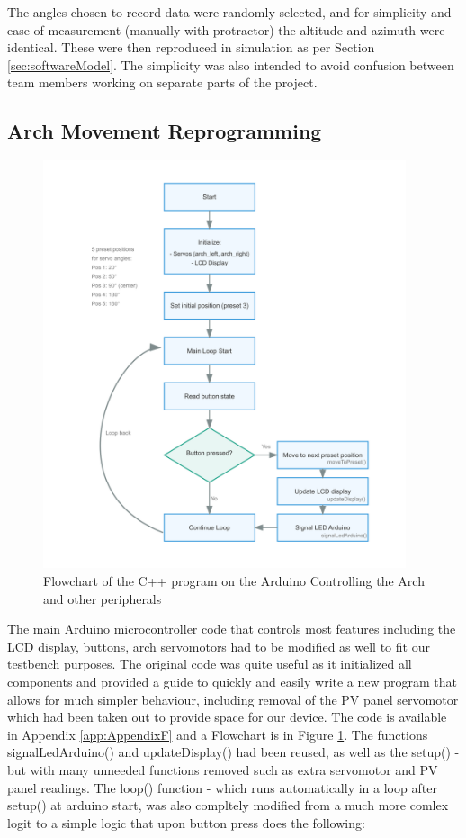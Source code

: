   
The angles chosen to record data were randomly selected, and for simplicity and ease of measurement (manually with protractor) the altitude and azimuth were identical. These were then reproduced in simulation as per Section \ref{sec:softwareModel}. The simplicity was also intended to avoid confusion between team members working on separate parts of the project.

\subsection{Arch Movement Reprogramming}
\begin{figure}[htbp] 
  \centering
  \includegraphics[width=0.95\textwidth]{chapters/methodology/RED/arch_flow.png}
  \caption{Flowchart of the C++ program on the Arduino Controlling the Arch and other peripherals}
  \label{fig:REDarchflowchart}
\end{figure}
The main Arduino microcontroller code that controls most features including the LCD display, buttons, arch servomotors had to be modified as well to fit our testbench purposes. The original code \cite{RefWorks:shopov2022renewable} was quite useful as it initialized all components and provided a guide to quickly and easily write a new program that allows for much simpler behaviour, including removal of the PV panel servomotor which had been taken out to provide space for our device. The code is available in Appendix \ref{app:AppendixF} and a Flowchart is in Figure \ref{fig:REDarchflowchart}. The functions signalLedArduino() and updateDisplay() had been reused, as well as the setup() - but with many unneeded functions removed such as extra servomotor and \ac{PV} panel readings. The loop() function - which runs automatically in a loop after setup() at arduino start, was also compltely modified from a much more comlex logit to a simple logic that upon button press does the following:
